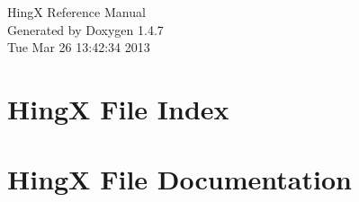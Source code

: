 \documentclass[a4paper]{book}
\begin{document}
\begin{titlepage}
\vspace*{7cm}
\begin{center}
{\Large Hing\-X Reference Manual}\\
\vspace*{1cm}
{\large Generated by Doxygen 1.4.7}\\
\vspace*{0.5cm}
{\small Tue Mar 26 13:42:34 2013}\\
\end{center}
\end{titlepage}
\clearemptydoublepage
{}
\tableofcontents
\clearemptydoublepage
{}
\chapter{Hing\-X File Index}

\chapter{Hing\-X File Documentation}


\printindex
\end{document}
